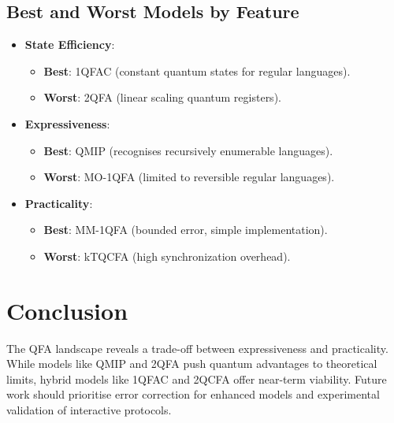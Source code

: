 \subsection*{Best and Worst Models by Feature}
\begin{itemize}
    \item \textbf{State Efficiency}: 
    \begin{itemize}
        \item \textbf{Best}: 1QFAC (constant quantum states for regular languages).  
        \item \textbf{Worst}: 2QFA (linear scaling quantum registers).
    \end{itemize}
    
    \item \textbf{Expressiveness}: 
    \begin{itemize}
        \item \textbf{Best}: QMIP (recognises recursively enumerable languages).  
        \item \textbf{Worst}: MO-1QFA (limited to reversible regular languages).
    \end{itemize}
    
    \item \textbf{Practicality}: 
    \begin{itemize}
        \item \textbf{Best}: MM-1QFA (bounded error, simple implementation).  
        \item \textbf{Worst}: kTQCFA (high synchronization overhead).
    \end{itemize}
\end{itemize}

\section*{Conclusion}
The QFA landscape reveals a trade-off between expressiveness and practicality. While models like QMIP and 2QFA push quantum advantages to theoretical limits, hybrid models like 1QFAC and 2QCFA offer near-term viability. Future work should prioritise error correction for enhanced models and experimental validation of interactive protocols.